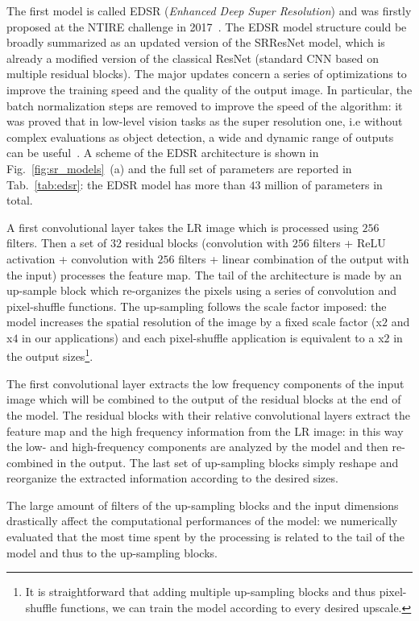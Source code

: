 \documentclass{standalone}
\begin{document}
The first model is called EDSR (\emph{Enhanced Deep Super Resolution}) and was firstly proposed at the NTIRE challenge in 2017~\cite{Agustsson_2017_CVPR_Workshops}.
The EDSR model structure could be broadly summarized as an updated version of the SRResNet model, which is already a modified version of the classical ResNet (standard CNN based on multiple residual blocks).
The major updates concern a series of optimizations to improve the training speed and the quality of the output image.
In particular, the batch normalization steps are removed to improve the speed of the algorithm: it was proved that in low-level vision tasks as the super resolution one, i.e without complex evaluations as object detection, a wide and dynamic range of outputs can be useful~\cite{edsr}.
A scheme of the EDSR architecture is shown in Fig.~\ref{fig:sr_models}~(a) and the full set of parameters are reported in Tab.~\ref{tab:edsr}: the EDSR model has more than $43$ million of parameters in total.

A first convolutional layer takes the LR image which is processed using $256$ filters.
Then a set of $32$ residual blocks (convolution with $256$ filters + ReLU activation + convolution with $256$ filters + linear combination of the output with the input) processes the feature map.
The tail of the architecture is made by an up-sample block which re-organizes the pixels using a series of convolution and pixel-shuffle functions.
The up-sampling follows the scale factor imposed: the model increases the spatial resolution of the image by a fixed scale factor (x$2$ and x$4$ in our applications) and each pixel-shuffle application is equivalent to a x$2$ in the output sizes\footnote{
  It is straightforward that adding multiple up-sampling blocks and thus pixel-shuffle functions, we can train the model according to every desired upscale.
}.

The first convolutional layer extracts the low frequency components of the input image which will be combined to the output of the residual blocks at the end of the model.
The residual blocks with their relative convolutional layers extract the feature map and the high frequency information from the LR image: in this way the low- and high-frequency components are  analyzed by the model and then re-combined in the output.
The last set of up-sampling blocks simply reshape and reorganize the extracted information according to the desired sizes.

The large amount of filters of the up-sampling blocks and the input dimensions drastically affect the computational performances of the model: we numerically evaluated that the most time spent by the processing is related to the tail of the model and thus to the up-sampling blocks.
\end{document}
